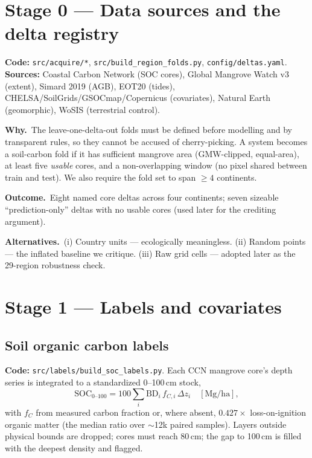 \documentclass[11pt]{article}
\newcommand{\file}[1]{\texttt{\small #1}}
\newcommand{\why}{\textbf{\color{nb}Why.}\ }
\newcommand{\out}{\textbf{\color{nb}Outcome.}\ }
\newcommand{\alt}{\textbf{\color{nb}Alternatives.}\ }
\begin{document}
\section{Stage 0 --- Data sources and the delta registry}
\textbf{Code:} \file{src/acquire/*}, \file{src/build\_region\_folds.py}, \file{config/deltas.yaml}.\\
\textbf{Sources:} Coastal Carbon Network (SOC cores), Global Mangrove Watch v3 (extent),
Simard 2019 (AGB), EOT20 (tides), CHELSA/SoilGrids/GSOCmap/Copernicus (covariates),
Natural Earth (geomorphic), WoSIS (terrestrial control).

\why The leave-one-delta-out folds must be defined before modelling and by transparent
rules, so they cannot be accused of cherry-picking. A system becomes a soil-carbon fold if
it has sufficient mangrove area (GMW-clipped, equal-area), at least five \emph{usable} cores,
and a non-overlapping window (no pixel shared between train and test). We also require the
fold set to span $\geq 4$ continents.

\out Eight named core deltas across four continents; seven sizeable ``prediction-only''
deltas with no usable cores (used later for the crediting argument).

\alt (i) Country units --- ecologically meaningless. (ii) Random points --- the inflated
baseline we critique. (iii) Raw grid cells --- adopted later as the 29-region robustness check.

\section{Stage 1 --- Labels and covariates}
\subsection{Soil organic carbon labels}
\textbf{Code:} \file{src/labels/build\_soc\_labels.py}.
Each CCN mangrove core's depth series is integrated to a standardized 0--100\,cm stock,
\begin{equation}
\mathrm{SOC}_{0\text{--}100}=100\sum_i \mathrm{BD}_i\,f_{C,i}\,\Delta z_i\quad[\si{\mega\gram\per\hectare}],
\end{equation}
with $f_C$ from measured carbon fraction or, where absent, $0.427\times$ loss-on-ignition
organic matter (the median ratio over $\sim$12k paired samples). Layers outside physical
bounds are dropped; cores must reach 80\,cm; the gap to 100\,cm is filled with the deepest
density and flagged.
\end{document}
